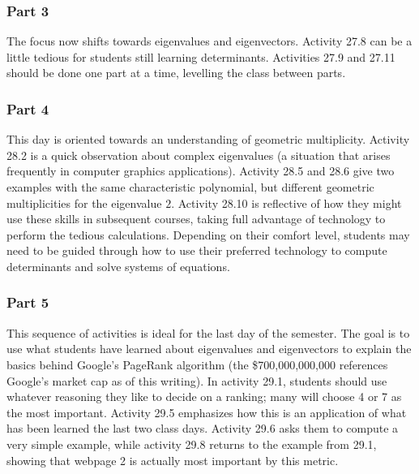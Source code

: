 \documentclass{article}
\begin{document}
\subsubsection*{Part 3}
The focus now shifts towards eigenvalues and eigenvectors.  Activity 27.8 can be a little tedious for students still learning determinants.  Activities 27.9 and 27.11 should be done one part at a time, levelling the class between parts.

\subsubsection*{Part 4}
This day is oriented towards an understanding of geometric multiplicity.  Activity 28.2 is a quick observation about complex eigenvalues (a situation that arises frequently in computer graphics applications).   Activity 28.5 and 28.6 give two examples with the same characteristic polynomial, but different geometric multiplicities for the eigenvalue $2$.  Activity 28.10 is reflective of how they might use these skills in subsequent courses, taking full advantage of technology to perform the tedious calculations.  Depending on their comfort level, students may need to be guided through how to use their preferred technology to compute determinants and solve systems of equations.

\subsubsection*{Part 5}
This sequence of activities is ideal for the last day of the semester.  The goal is to use what students have learned about eigenvalues and eigenvectors to explain the basics behind Google's PageRank algorithm (the \$700,000,000,000 references Google's market cap as of this writing).  In activity 29.1, students should use whatever reasoning they like to decide on a ranking; many will choose 4 or 7 as the most important.  Activity 29.5 emphasizes how this is an application of what has been learned the last two class days.  Activity 29.6 asks them to compute a very simple example, while activity 29.8 returns to the example from 29.1, showing that webpage 2 is actually most important by this metric.
\end{document}
